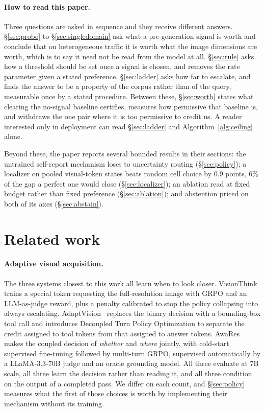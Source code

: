 \documentclass[10pt,twocolumn]{article}
\theoremstyle{plain}
\begin{document}
\paragraph{How to read this paper.} Three questions are asked in sequence and
they receive different answers. \S\ref{sec:probe} to \S\ref{sec:singledomain} ask
what a pre-generation signal is worth and conclude that on heterogeneous
traffic it is worth what the image dimensions are worth, which is to say it
need not be read from the model at all. \S\ref{sec:rule} asks how a threshold
should be set once a signal is chosen, and removes the rate parameter given a
stated preference. \S\ref{sec:ladder} asks how far to escalate, and finds the
answer to be a property of the corpus rather than of the query, measurable once
by a stated procedure. Between these, \S\ref{sec:worth} states what clearing
the no-signal baseline certifies, measures how permissive that baseline is,
and withdraws the one pair where it is too permissive to credit us. A reader
interested only in deployment can read \S\ref{sec:ladder} and Algorithm~\ref{alg:ceiling}
alone.

Beyond these, the paper reports several bounded results in their sections: the
untrained self-report mechanism loses to uncertainty routing
(\S\ref{sec:policy}); a localizer on pooled visual-token states beats random
cell choice by $0.9$ points, $6\%$ of the gap a perfect one would close
(\S\ref{sec:localizer}); an ablation read at fixed budget rather than fixed
preference (\S\ref{sec:ablation}); and abstention priced on both of its axes
(\S\ref{sec:abstain}).

\section{Related work}

\paragraph{Adaptive visual acquisition.} The three systems closest to this work
all learn when to look closer. VisionThink~\cite{visionthink} trains a special
token requesting the full-resolution image with GRPO and an LLM-as-judge reward,
plus a penalty calibrated to stop the policy collapsing into always
escalating. AdaptVision~\cite{adaptvision} replaces the binary decision with a
bounding-box tool call and introduces Decoupled Turn Policy Optimization to
separate the credit assigned to tool tokens from that assigned to answer
tokens. AwaRes~\cite{awares} makes the coupled decision of \emph{whether} and
\emph{where} jointly, with cold-start supervised fine-tuning followed by
multi-turn GRPO, supervised automatically by a LLaMA-3.3-70B judge and an oracle
grounding model. All three evaluate at 7B scale, all three learn the decision
rather than reading it, and all three condition on the output of a completed
pass. We differ on each count, and \S\ref{sec:policy} measures what the first
of those choices is worth by implementing their mechanism without its training.
\end{document}
